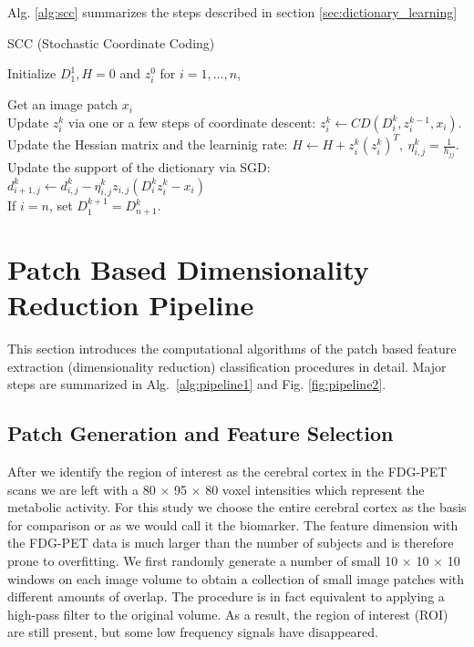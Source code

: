 Alg. \ref{alg:scc} summarizes the steps described in section \ref{sec:dictionary_learning}

\begin{algorithm}
	
	\caption{SCC (Stochastic Coordinate Coding)}\label{alg:scc}
	
	
	Initialize $ D_1^1, H = 0 $ and $ z_i^0 $ for $ i = 1,\dots,n $,
	
	{
		{Get an image patch $ x_i $\\
			Update $ z_i^k $ via one or a few steps of coordinate descent: \hspace{1.5cm}$ z_i^k \gets CD(D_i^k,z^{k-1}_i,x_i)$.\\
			Update the Hessian matrix and the learninig rate:
			\hspace{1.5cm}$ H \gets H + z^k_i(z^k_i)^T, ~\eta^k_{i,j} = \frac{1}{h_{jj}} $.\\
			Update the support of the dictionary via SGD:
			\hspace{1.5cm}$ d^k_{i+1,j} \gets d^k_{i,j} - \eta^k_{i,j}z_{i,j}(D_i^kz^k_i - x_i) $\\
			If $ i = n $, set $ D_1^{k+1} = D^k_{n+1} $.
		}
	}
	
\end{algorithm}

\pagebreak
\section{Patch Based Dimensionality Reduction Pipeline}
\label{sec:dimension_reduction}

This section introduces the computational algorithms of the patch based feature extraction (dimensionality reduction) classification procedures in detail. Major steps are summarized in Alg.~\ref{alg:pipeline1} and Fig. \ref{fig:pipeline2}. 

\subsection{Patch Generation and Feature Selection}
\label{subsec:patch_generation}
After we identify the region of interest as the cerebral cortex in the FDG-PET scans we are left with a 80 $ \times $ 95 $ \times $ 80 voxel intensities which represent the metabolic activity. For this study we choose the entire cerebral cortex as the basis for comparison or as we would call it the biomarker. The feature dimension with the FDG-PET data is much larger than the number of subjects and is therefore prone to overfitting. We first randomly generate a number of small 10 $ \times $ 10 $ \times $ 10 windows on each image volume to obtain a collection of small image patches with different amounts of overlap. The procedure is in fact equivalent to applying a high-pass filter to the original volume. As a result, the region of interest (ROI) are still present, but some low frequency signals have disappeared. 

